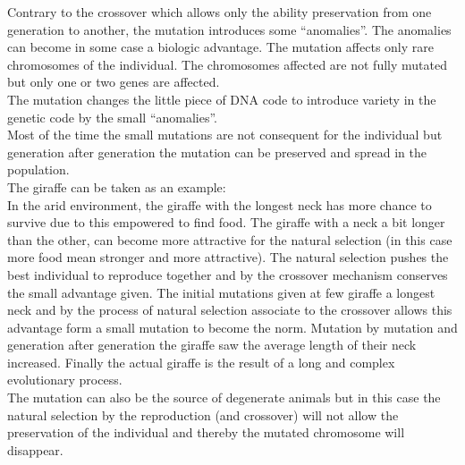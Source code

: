 Contrary to the crossover which allows only the ability preservation from one generation to another, the mutation introduces some “anomalies”. The anomalies can become in some case a biologic advantage.
The mutation affects only rare chromosomes of the individual. The chromosomes affected are not fully mutated but only one or two genes are affected. \\
The mutation changes the little piece of DNA code to introduce variety in the genetic code by the small “anomalies”.\\
Most of the time the small mutations are not consequent for the individual but generation after generation the mutation can be preserved and spread in the population. \\  



The giraffe can be taken as an example:\\
 In the arid environment, the giraffe with the longest neck has more chance to survive due to this empowered to find food. The giraffe with a neck a bit longer than the other, can become more attractive for the natural selection (in this case more food mean stronger and more attractive). The natural selection pushes the best individual to reproduce together and by the crossover mechanism conserves the small advantage given. The initial mutations given at few giraffe a longest neck and by the process of natural selection associate to the crossover allows this advantage form a small mutation to become the norm. Mutation by mutation and generation after generation the giraffe  saw the average length of their neck increased. Finally the actual giraffe is the result of a long and complex evolutionary process. \\ 
The mutation can also be the source of degenerate animals but in this case the natural selection  by the reproduction (and crossover) will not allow the preservation of the individual and thereby the mutated chromosome will disappear.\\ 
